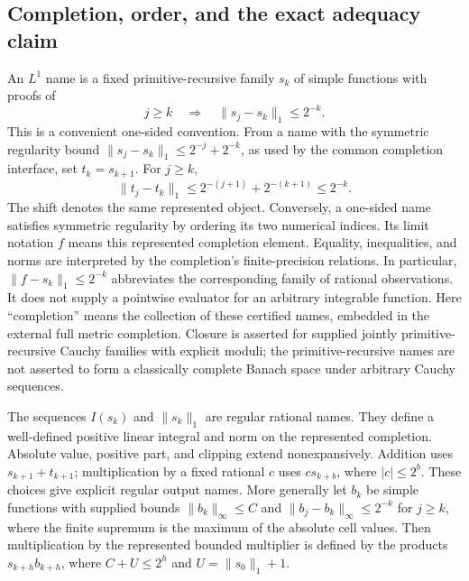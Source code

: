 \subsection{Completion, order, and the exact adequacy claim}

An \(L^1\) name is a fixed primitive-recursive family \(s_k\) of simple
functions with proofs of
\begin{equation}
 j\geq k\quad\Longrightarrow\quad
 \|s_j-s_k\|_1\leq2^{-k}.
 \label{eq:measure-regular}
\end{equation}
This is a convenient one-sided convention.  From a name with the symmetric
regularity bound \(\|s_j-s_k\|_1\leq2^{-j}+2^{-k}\), as used by the
common completion interface, set \(t_k=s_{k+1}\).  For \(j\geq k\),
\[
 \|t_j-t_k\|_1\leq2^{-(j+1)}+2^{-(k+1)}\leq2^{-k}.
\]
The shift denotes the same represented object.  Conversely, a one-sided
name satisfies symmetric regularity by ordering its two numerical indices.
Its limit notation \(f\) means this represented completion element.
Equality, inequalities, and norms are interpreted by the completion's
finite-precision relations.  In particular, \(\|f-s_k\|_1\leq2^{-k}\)
abbreviates the corresponding family of rational observations.  It does
not supply a pointwise evaluator for an arbitrary integrable function.
Here ``completion'' means the collection of these certified names, embedded
in the external full metric completion.  Closure is asserted for supplied
jointly primitive-recursive Cauchy families with explicit moduli; the
primitive-recursive names are not asserted to form a classically complete
Banach space under arbitrary Cauchy sequences.

\begin{theorem}
\label{thm:measure-completion}
The sequences \(I(s_k)\) and \(\|s_k\|_1\) are regular rational names.
They define a well-defined positive linear integral and norm on the
represented completion.  Absolute value, positive part, and clipping extend
nonexpansively.  Addition uses \(s_{k+1}+t_{k+1}\); multiplication by a fixed
rational \(c\) uses \(cs_{k+b}\), where \(|c|\leq2^b\).  These choices
give explicit regular output names.  More generally let \(b_k\) be simple
functions with supplied bounds
\(\|b_k\|_\infty\leq C\) and
\(\|b_j-b_k\|_\infty\leq2^{-k}\) for \(j\geq k\), where the finite
supremum is the maximum of the absolute cell values.  Then multiplication
by the represented bounded multiplier is defined by the products
\(s_{k+h}b_{k+h}\), where
\(C+U\leq2^h\) and \(U=\|s_0\|_1+1\).
\end{theorem}

